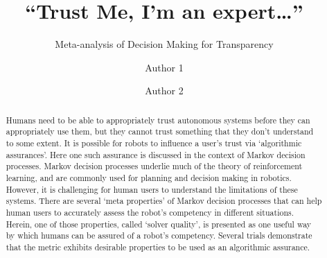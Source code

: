 \documentclass[sigconf,authordraft]{acmart}
\begin{document}
\title{``Trust Me, I'm an expert\ldots''}
\subtitle{Meta-analysis of Decision Making for Transparency}
\author{Author 1}
\author{Author 2}
\begin{abstract}
    Humans need to be able to appropriately trust autonomous systems before they can appropriately use them, but they cannot trust something that they don't understand to some extent. It is possible for robots to influence a user's trust via `algorithmic assurances'. Here one such assurance is discussed in the context of Markov decision processes. Markov decision processes underlie much of the theory of reinforcement learning, and are commonly used for planning and decision making in robotics. However, it is challenging for human users to understand the limitations of these systems. There are several `meta properties' of Markov decision processes that can help human users to accurately assess the robot's competency in different situations. Herein, one of those properties, called `solver quality', is presented as one useful way by which humans can be assured of a robot's competency. Several trials demonstrate that the metric exhibits desirable properties to be used as an algorithmic assurance.
\end{abstract}
\maketitle








\end{document}
